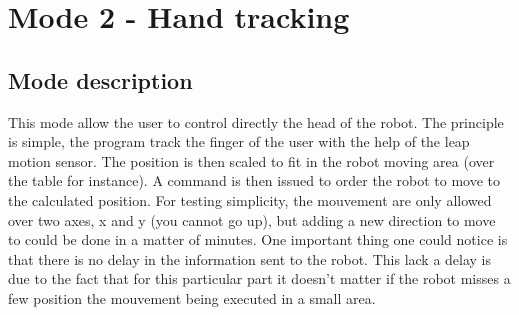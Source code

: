 \section{Mode 2 - Hand tracking}

\subsection{Mode description}

This mode allow the user to control directly the head of the robot. The principle is simple, the program track the finger of the user with the help of the leap motion sensor. The position is then scaled to fit in the robot moving area (over the table for instance). A command is then issued to order the robot to move to the calculated position. For testing simplicity, the mouvement are only allowed over two axes, x and y (you cannot go up), but adding a new direction to move to could be done in a matter of minutes.
One important thing one could notice is that there is no delay in the information sent to the robot. This lack a delay is due to the fact that for this particular part it doesn't matter if the robot misses a few position the mouvement being executed in a small area.
